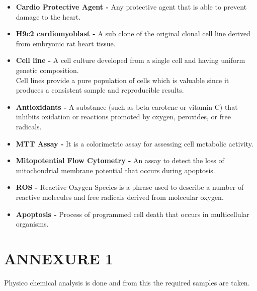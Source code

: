 \documentclass[11pt]{article} %
\begin{document}
\begin{itemize}
	\item \textbf{Cardio Protective Agent - } Any protective agent that is able to prevent damage to the heart.
	\item \textbf{H9c2 cardiomyoblast - } A sub clone of the original clonal cell line derived from embryonic rat heart tissue.
	\item \textbf{Cell line - }A cell culture developed from a single cell and having uniform genetic composition. \\
	Cell lines provide a pure population of cells which is valuable since it produces a    consistent sample and reproducible results.
	\item \textbf{Antioxidants - } A substance (such as beta-carotene or vitamin C) that inhibits oxidation or reactions promoted by oxygen, peroxides, or free radicals.	
	\item \textbf{MTT Assay - } It is a colorimetric assay for assessing cell metabolic activity.
	\item \textbf{Mitopotential Flow Cytometry - } An assay to detect the loss of mitochondrial membrane potential that occurs during apoptosis.
	\item \textbf{ROS - } Reactive Oxygen Species is a phrase used to describe a number of reactive molecules and free radicals derived from molecular oxygen.
	\item \textbf{Apoptosis - } Process of programmed cell death that occurs in multicellular organisms.
\end{itemize}



\section*{ANNEXURE 1}

Physico chemical analysis is done and from this the required samples are taken.


\end{document}
